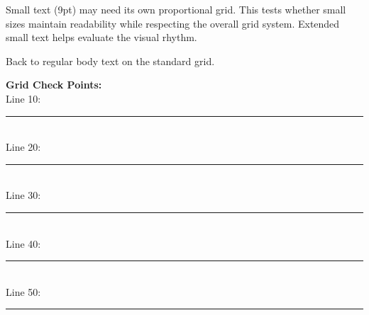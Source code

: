 \documentclass[11pt]{article}
\begin{document}
{\footnotesize Small text (9pt) may need its own proportional grid. This tests whether small sizes maintain readability while respecting the overall grid system. Extended small text helps evaluate the visual rhythm.}

Back to regular body text on the standard grid.


\vspace{13.2pt}
\noindent\textbf{Grid Check Points:}\\
Line 10: \rule{3cm}{0.4pt}\\
Line 20: \rule{3cm}{0.4pt}\\
Line 30: \rule{3cm}{0.4pt}\\
Line 40: \rule{3cm}{0.4pt}\\
Line 50: \rule{3cm}{0.4pt}
\end{document}
